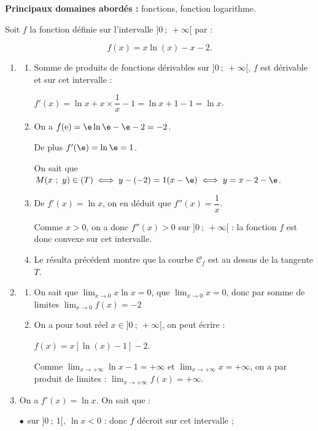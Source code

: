 \textbf{Principaux domaines abordés :} fonctions, fonction logarithme.

\medskip

Soit $f$ la fonction définie sur l'intervalle $]0~;~+\infty[$ par :

\[f(x) = x \ln (x) - x - 2.\]







\begin{enumerate}
\item 
	\begin{enumerate}
		\item 
		Somme de produits de fonctions dérivables sur $]0~;~+\infty[$, \: $f$ est dérivable et sur cet intervalle :
		
		$f'(x) = \ln x + x \times \dfrac1x - 1 = \ln x + 1 - 1 = \ln x$.
		\item 
On a $f(\text{e}) = \e \ln \e - \e - 2 = - 2$.

De plus $f'(\e) = \ln \e = 1$.

On sait que $M(x~;~y) \in (T) \iff y - (- 2) = 1(x - \e) \iff y = x - 2 - \e$.
		\item 
De $f'(x) = \ln x$, on en déduit que $f''(x) = \dfrac1x$.

Comme $x > 0$, on a donc $f''(x) > 0$ sur $]0~;~+\infty[$ : la fonction $f$ est donc convexe sur cet intervalle.
		\item 
		Le résulta précédent montre que la courbe $\mathcal{C}_f$ est au dessus de la tangente $T$.
	\end{enumerate}	
\item 
	\begin{enumerate}
		\item 
On sait que $\displaystyle\lim_{x \to 0} x \ln x = 0$, que $\displaystyle\lim_{x \to 0} x  = 0$, donc par somme de limites $\displaystyle\lim_{x \to 0} f(x) = - 2$
		\item 
On a pour tout réel $x \in ]0~;~+ \infty[$, on peut écrire :

$f(x) = x\left[\ln (x) - 1\right] - 2$.

Comme $\displaystyle\lim_{x \to + \infty} \ln x - 1 = + \infty$ et $\displaystyle\lim_{x \to + \infty} x = + \infty$, on a par produit de limites : $\displaystyle\lim_{x \to + \infty} f(x) = + \infty$.
	\end{enumerate}
\item 
On a $f'(x) = \ln x$. On sait que :

$\bullet~~$sur $]0~;~1[, \: \ln x < 0$ : donc $f$ décroit sur cet intervalle ;


\end{enumerate}
